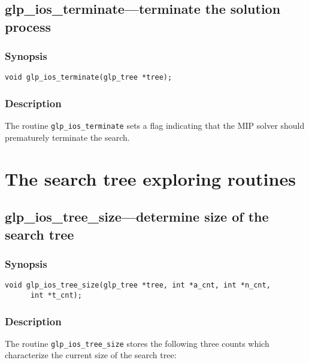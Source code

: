 \newpage

\subsection{glp\_ios\_terminate---terminate the solution process}

\subsubsection*{Synopsis}

\begin{verbatim}
void glp_ios_terminate(glp_tree *tree);
\end{verbatim}

\subsubsection*{Description}

The routine \verb|glp_ios_terminate| sets a flag indicating that the
MIP solver should prematurely terminate the search.


\newpage

\section{The search tree exploring routines}

\subsection{glp\_ios\_tree\_size---determine size of the search tree}

\subsubsection*{Synopsis}

\begin{verbatim}
void glp_ios_tree_size(glp_tree *tree, int *a_cnt, int *n_cnt,
      int *t_cnt);
\end{verbatim}

\subsubsection*{Description}

The routine \verb|glp_ios_tree_size| stores the following three counts
which characterize the current size of the search tree:

